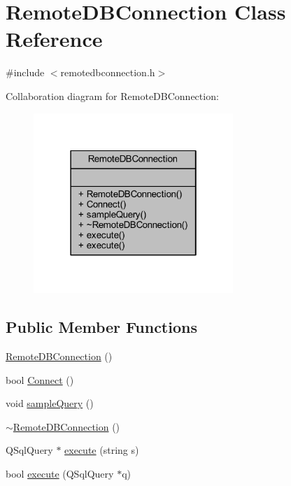 \hypertarget{class_remote_d_b_connection}{}\section{Remote\+D\+B\+Connection Class Reference}
\label{class_remote_d_b_connection}


{\ttfamily \#include $<$remotedbconnection.\+h$>$}



Collaboration diagram for Remote\+D\+B\+Connection\+:
\nopagebreak
\begin{figure}[H]
\begin{center}
\leavevmode
\includegraphics[width=214pt]{class_remote_d_b_connection__coll__graph}
\end{center}
\end{figure}
\subsection*{Public Member Functions}
\begin{DoxyCompactItemize}
\item 
\hyperlink{class_remote_d_b_connection_a0976c61c3dc083b361f2b9eb11ed89f5}{Remote\+D\+B\+Connection} ()
\item 
bool \hyperlink{class_remote_d_b_connection_a25be5c4d18da25b8fa8ef2a1985bb544}{Connect} ()
\item 
void \hyperlink{class_remote_d_b_connection_a1dcd622723d927b9f384460baa325f01}{sample\+Query} ()
\item 
\hyperlink{class_remote_d_b_connection_af0346d948e75009a0e392808b33e8ea6}{$\sim$\+Remote\+D\+B\+Connection} ()
\item 
Q\+Sql\+Query $\ast$ \hyperlink{class_remote_d_b_connection_a28c02b94b6298b55da2faee720b53de4}{execute} (string s)
\item 
bool \hyperlink{class_remote_d_b_connection_a20720afee6dd3c967323704069c043d3}{execute} (Q\+Sql\+Query $\ast$q)
\end{DoxyCompactItemize}


